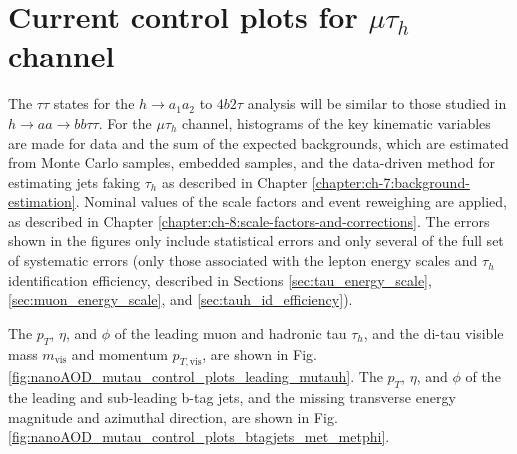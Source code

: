 \section{Current control plots for \texorpdfstring{$\mu\tau_{h}$}{mutauh} channel}

The $\tau\tau$ states for the $h \rightarrow a_1 a_2$ to $4b2\tau$ analysis will be similar to those studied in $h\rightarrow aa \rightarrow bb\tau\tau$. For the $\mu\tau_{h}$ channel, histograms of the key kinematic variables are made for data and the sum of the expected backgrounds, which are estimated from Monte Carlo samples, embedded samples, and the data-driven method for estimating jets faking $\tau_{h}$ as described in Chapter \ref{chapter:ch-7:background-estimation}. Nominal values of the scale factors and event reweighing are applied, as described in Chapter \ref{chapter:ch-8:scale-factors-and-corrections}. The errors shown in the figures only include statistical errors and only several of the full set of systematic errors (only those associated with the lepton energy scales and $\tau_{h}$ identification efficiency, described in Sections \ref{sec:tau_energy_scale}, \ref{sec:muon_energy_scale}, and \ref{sec:tauh_id_efficiency}). 

The $p_{T}$, $\eta$, and $\phi$ of the leading muon and hadronic tau $\tau_{h}$, and the di-tau visible mass $m_{\text{vis}}$ and momentum $p_{T, \text{vis}}$, are shown in Fig. \ref{fig:nanoAOD_mutau_control_plots_leading_mutauh}. The $p_{T}$, $\eta$, and $\phi$ of the the leading and sub-leading b-tag jets, and the missing transverse energy magnitude and azimuthal direction, are shown in Fig. \ref{fig:nanoAOD_mutau_control_plots_btagjets_met_metphi}.

